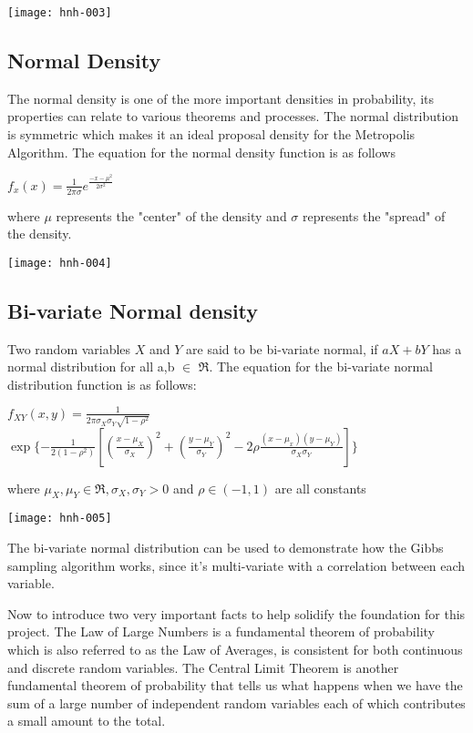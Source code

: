 \documentclass[11pt,a4paper]{article}
\theoremstyle{plain}
\begin{document}
\texttt{[image: hnh-003]}


\subsection*{Normal Density}
The normal density is one of the more important densities in probability, its properties can relate to various theorems and processes. The normal distribution is symmetric which makes it an ideal proposal density for the Metropolis Algorithm. 
\newline The equation for the normal density function is as follows
\begin{center}
$f_x(x)=\frac{1}{2\pi\sigma} e^\frac{-{x-\mu}^2}{2\sigma^2}$
\end{center}
where $\mu$ represents the "center" of the density and $\sigma$ represents the "spread" of the density.

\texttt{[image: hnh-004]}

\subsection*{Bi-variate Normal density}
 Two random variables $X$ and $Y$ are said to be bi-variate normal, if $aX+bY$ has a normal distribution for all a,b $\in$ $\Re$.
\newline The equation for the bi-variate normal distribution function is as follows:
\begin{center}$f_{XY}(x,y)=\frac{1}{2\pi \sigma_X \sigma_Y \sqrt{1-\rho^2}}$ 
$\exp\{-\frac{1}{2(1-\rho^2)}[(\frac{x-\mu_X}{\sigma_X})^2+(\frac{y-\mu_Y}{\sigma_Y})^2-2\rho\frac{(x-\mu_x)(y-\mu_Y)}{\sigma_X\sigma_Y}]\}$
\end{center}
 where $\mu_X,\mu_Y  \in  \Re, \sigma_X, \sigma_Y > 0$ and $\rho \in (-1,1)$ are all constants

\texttt{[image: hnh-005]}

The bi-variate normal distribution can be used to demonstrate how the Gibbs sampling algorithm works, since it's multi-variate with a correlation between each variable.

\newpage

Now to introduce two very important facts to help solidify the foundation for this project. The Law of Large Numbers is a fundamental theorem of probability which is also referred to as the Law of Averages, is consistent for both continuous and discrete random variables. The Central Limit Theorem is another fundamental theorem of probability that  tells us what happens when we have the sum of a large number of independent random variables each of which contributes a small amount to the total.
\end{document}
